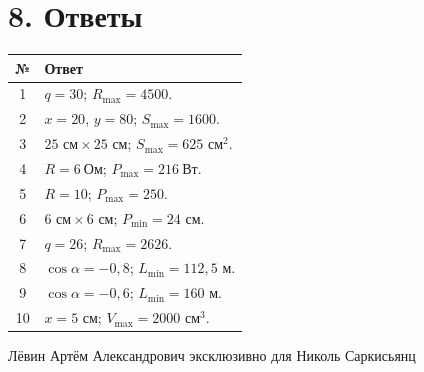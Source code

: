 \documentclass[a4paper,12pt]{article}
\begin{document}
\clearpage

\section*{8. Ответы}
\begin{center}
\begin{tabularx}{0.96\linewidth}{@{}c X@{}}
\toprule
\textbf{№} & \textbf{Ответ} \\
\midrule
1 & \(q=30\); \(R_{\max}=4500\). \\
2 & \(x=20\), \(y=80\); \(S_{\max}=1600\). \\
3 & \(25\text{ см}\times25\text{ см}\); \(S_{\max}=625\text{ см}^2\). \\
4 & \(R=6\ \text{Ом}\); \(P_{\max}=216\ \text{Вт}\). \\
5 & \(R=10\); \(P_{\max}=250\). \\
6 & \(6\text{ см}\times6\text{ см}\); \(P_{\min}=24\text{ см}\). \\
7 & \(q=26\); \(R_{\max}=2626\). \\
8 & \(\cos\alpha=-0{,}8\); \(L_{\min}=112{,}5\text{ м}\). \\
9 & \(\cos\alpha=-0{,}6\); \(L_{\min}=160\text{ м}\). \\
10 & \(x=5\text{ см}\); \(V_{\max}=2000\text{ см}^3\). \\
\bottomrule
\end{tabularx}
\end{center}

\vfill
\begin{center}
\small\color{textgray}
Лёвин Артём Александрович эксклюзивно для Николь Саркисьянц
\end{center}
\end{document}
